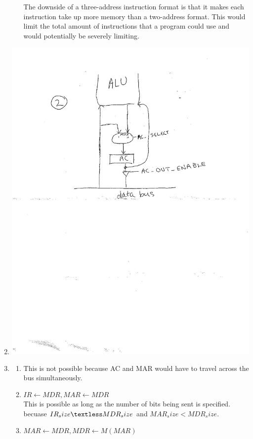 \documentclass{article}
\begin{document}
\begin{enumerate}
\begin{enumerate}
        The downside of a three-address instruction format is that it makes each instruction take up more memory than a two-address format.  This would limit the total amount of instructions that a program could use and would potentially be severely limiting.\\
      \end{enumerate}
    \item \includegraphics{a1-p2.jpg}
    \item\begin{enumerate}
      \item This is not possible because AC and MAR would have to travel across the bus simultaneously.
      \item $IR \leftarrow MDR, MAR \leftarrow MDR$\\
        This is possible as long as the number of bits being sent is specified.  becuase $IR_size \textless MDR_size$ and $MAR_size < MDR_size$.
      \item $MAR \leftarrow MDR, MDR \leftarrow M(MAR)$

\end{enumerate}
\end{enumerate}
\end{document}

